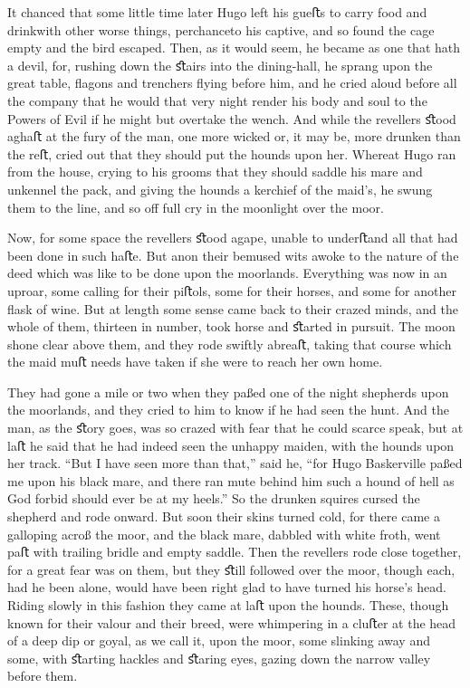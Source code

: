 \documentclass[paper=5.5in:8.5in,BCOR=7mm,twoside,DIV=calc,12pt,usegeometry,openany,chapterprefix,endperiod,headings=big]{scrbook} %
\begin{document}
It chanced that some little time later Hugo left his gueﬅs to carry food and drink\textemdash with other worse things, perchance\textemdash to his captive, and so found the cage empty and the bird escaped. Then, as it would seem, he became as one that hath a devil, for, rushing down the ﬆairs into the dining-hall, he sprang upon the great table, ﬂagons and trenchers ﬂying before him, and he cried aloud before all the company that he would that very night render his body and soul to the Powers of Evil if he might but overtake the wench. And while the revellers ﬆood aghaﬅ at the fury of the man, one more wicked or, it may be, more drunken than the reﬅ, cried out that they should put the hounds upon her. Whereat Hugo ran from the house, crying to his grooms that they should saddle his mare and unkennel the pack, and giving the hounds a kerchief of the maid's, he swung them to the line, and so oﬀ full cry in the moonlight over the moor.

Now, for some space the revellers ﬆood agape, unable to underﬅand all that had been done in such haﬅe. But anon their bemused wits awoke to the nature of the deed which was like to be done upon the moorlands. Everything was now in an uproar, some calling for their piﬅols, some for their horses, and some for another ﬂask of wine. But at length some sense came back to their crazed minds, and the whole of them, thirteen in number, took horse and ﬆarted in pursuit. The moon shone clear above them, and they rode swiftly abreaﬅ, taking that course which the maid muﬅ needs have taken if she were to reach her own home.

They had gone a mile or two when they paßed one of the night shepherds upon the moorlands, and they cried to him to know if he had seen the hunt. And the man, as the ﬆory goes, was so crazed with fear that he could scarce speak, but at laﬅ he said that he had indeed seen the unhappy maiden, with the hounds upon her track. \enquote{But I have seen more than that,} said he, \enquote{for Hugo Baskerville paßed me upon his black mare, and there ran mute behind him such a hound of hell as God forbid should ever be at my heels.} So the drunken squires cursed the shepherd and rode onward. But soon their skins turned cold, for there came a galloping acroß the moor, and the black mare, dabbled with white froth, went paﬅ with trailing bridle and empty saddle. Then the revellers rode close together, for a great fear was on them, but they ﬆill followed over the moor, though each, had he been alone, would have been right glad to have turned his horse's head. Riding slowly in this fashion they came at laﬅ upon the hounds. These, though known for their valour and their breed, were whimpering in a cluﬅer at the head of a deep dip or goyal, as we call it, upon the moor, some slinking away and some, with ﬆarting hackles and ﬆaring eyes, gazing down the narrow valley before them.
\end{document}
